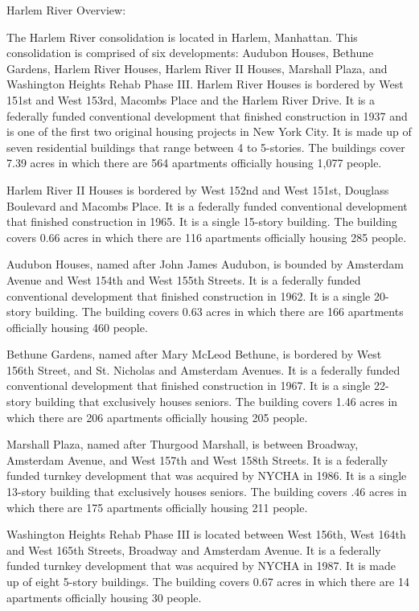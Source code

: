 Harlem River Overview:



The Harlem River consolidation is located in Harlem, Manhattan. This consolidation is comprised of six developments: Audubon Houses, Bethune Gardens, Harlem River Houses, Harlem River II Houses, Marshall Plaza, and Washington Heights Rehab Phase III. Harlem River Houses is bordered by West 151st and West 153rd, Macombs Place and the Harlem River Drive. It is a federally funded conventional development that finished construction in 1937 and is one of the first two original housing projects in New York City. It is made up of seven residential buildings that range between 4 to 5-stories. The buildings cover 7.39 acres in which there are 564 apartments officially housing 1,077 people. 



Harlem River II Houses is bordered by West 152nd and West 151st, Douglass Boulevard and Macombs Place. It is a federally funded conventional development that finished construction in 1965. It is a single 15-story building. The building covers 0.66 acres in which there are 116 apartments officially housing 285 people. 



Audubon Houses, named after John James Audubon, is bounded by Amsterdam Avenue and West 154th and West 155th Streets. It is a federally funded conventional development that finished construction in 1962. It is a single 20-story building. The building covers 0.63 acres in which there are 166 apartments officially housing 460 people. 



Bethune Gardens, named after Mary McLeod Bethune, is bordered by West 156th Street, and St. Nicholas and Amsterdam Avenues. It is a federally funded conventional development that finished construction in 1967. It is a single 22-story building that exclusively houses seniors. The building covers 1.46 acres in which there are 206 apartments officially housing 205 people.

Marshall Plaza, named after Thurgood Marshall, is between Broadway, Amsterdam Avenue, and West 157th and West 158th Streets. It is a federally funded turnkey development that was acquired by NYCHA in 1986. It is a single 13-story building that exclusively houses seniors. The building covers .46 acres in which there are 175 apartments officially housing 211 people.

Washington Heights Rehab Phase III is located between West 156th, West 164th and West 165th Streets, Broadway and Amsterdam Avenue. It is a federally funded turnkey development that was acquired by NYCHA in 1987. It is made up of eight 5-story buildings. The building covers 0.67 acres in which there are 14 apartments officially housing 30 people.